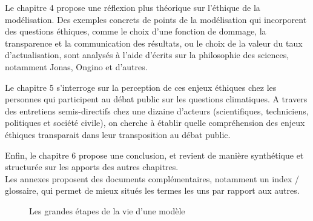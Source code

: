 Le chapitre 4 propose une réflexion plus théorique sur l'éthique de la modélisation. Des exemples concrets de points de la modélisation qui incorporent des questions éthiques, comme le choix d'une fonction de dommage, la transparence et la communication des résultats, ou le choix de la valeur du taux d'actualisation, sont analysés à l'aide d'écrits sur la philosophie des sciences, notamment Jonas, Ongino et d'autres. 

Le chapitre 5 s'interroge sur la perception de ces enjeux éthiques chez les personnes qui participent au débat public sur les questions climatiques. A travers des entretiens semis-directifs chez une dizaine d'acteurs (scientifiques, techniciens, politiques et société civile), on cherche à établir quelle compréhension des enjeux éthiques transparait dans leur transposition au débat public. 

Enfin, le chapitre 6 propose une conclusion, et revient de manière synthétique et structurée sur les apports des autres chapitres. \\

Les annexes proposent des documents complémentaires, notamment un index / glossaire, qui permet de mieux situés les termes les uns par rapport aux autres. 

\begin{figure}
    \begin{center}
\end{center}
    \caption{Les grandes étapes de la vie d'une modèle}
    \label{fig:enter-label}
\end{figure}